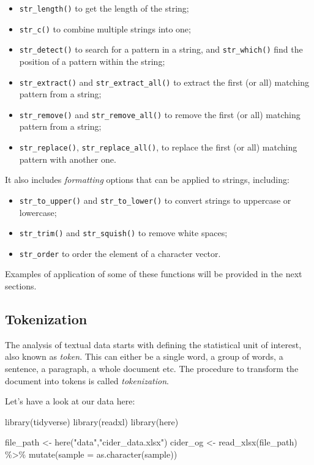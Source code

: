 \documentclass[
]{book}
\newenvironment{Shaded}{\begin{snugshade}}{\end{snugshade}}
\newcommand{\AttributeTok}[1]{\textcolor[rgb]{0.77,0.63,0.00}{#1}}
\newcommand{\FunctionTok}[1]{\textcolor[rgb]{0.00,0.00,0.00}{#1}}
\newcommand{\NormalTok}[1]{#1}
\newcommand{\OtherTok}[1]{\textcolor[rgb]{0.56,0.35,0.01}{#1}}
\newcommand{\SpecialCharTok}[1]{\textcolor[rgb]{0.00,0.00,0.00}{#1}}
\newcommand{\StringTok}[1]{\textcolor[rgb]{0.31,0.60,0.02}{#1}}
\providecommand{\tightlist}{%
  \setlength{\itemsep}{0pt}\setlength{\parskip}{0pt}}
\begin{document}
\begin{itemize}
\tightlist
\item
  \texttt{str\_length()} to get the length of the string;
\item
  \texttt{str\_c()} to combine multiple strings into one;
\item
  \texttt{str\_detect()} to search for a pattern in a string, and \texttt{str\_which()} find the position of a pattern within the string;
\item
  \texttt{str\_extract()} and \texttt{str\_extract\_all()} to extract the first (or all) matching pattern from a string;
\item
  \texttt{str\_remove()} and \texttt{str\_remove\_all()} to remove the first (or all) matching pattern from a string;
\item
  \texttt{str\_replace()}, \texttt{str\_replace\_all()}, to replace the first (or all) matching pattern with another one.
\end{itemize}

It also includes \emph{formatting} options that can be applied to strings, including:

\begin{itemize}
\tightlist
\item
  \texttt{str\_to\_upper()} and \texttt{str\_to\_lower()} to convert strings to uppercase or lowercase;
\item
  \texttt{str\_trim()} and \texttt{str\_squish()} to remove white spaces;
\item
  \texttt{str\_order} to order the element of a character vector.
\end{itemize}

Examples of application of some of these functions will be provided in the next sections.

\hypertarget{tokenization}{%
\subsection{Tokenization}\label{tokenization}}

The analysis of textual data starts with defining the statistical unit of interest, also known as \emph{token}. This can either be a single word, a group of words, a sentence, a paragraph, a whole document etc. The procedure to transform the document into tokens is called \emph{tokenization}.

Let's have a look at our data here:

\begin{Shaded}
\begin{Highlighting}[]
\FunctionTok{library}\NormalTok{(tidyverse)}
\FunctionTok{library}\NormalTok{(readxl)}
\FunctionTok{library}\NormalTok{(here)}

\NormalTok{file\_path }\OtherTok{\textless{}{-}} \FunctionTok{here}\NormalTok{(}\StringTok{"data"}\NormalTok{,}\StringTok{"cider\_data.xlsx"}\NormalTok{) }
\NormalTok{cider\_og }\OtherTok{\textless{}{-}} \FunctionTok{read\_xlsx}\NormalTok{(file\_path) }\SpecialCharTok{\%\textgreater{}\%} 
  \FunctionTok{mutate}\NormalTok{(}\AttributeTok{sample =} \FunctionTok{as.character}\NormalTok{(sample))}
\end{Highlighting}
\end{Shaded}
\end{document}
